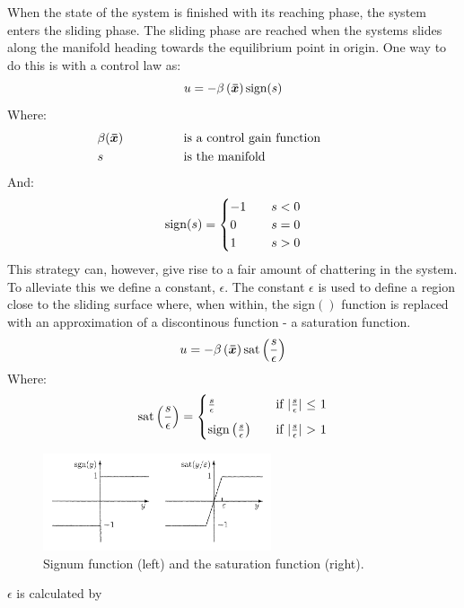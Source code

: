 When the state of the system is finished with its reaching phase, the system enters the sliding phase. The sliding phase
are reached when the systems slides along the manifold heading towards the equilibrium point in origin. One way to do
this is with a control law as:
\begin{equation}
  u = -\beta \left( \bm{\bar{x}} \right)\mathrm{sign}(s)
\end{equation}
Where:
\begin{alignat}{5}
       & \beta (\bm{\bar{x}}) & \hspace{1cm} & \quad\text{is a control gain function} \hspace{1cm} &  & \nonumber \\ 
       & s                & \hspace{1cm} & \quad\text{is the manifold} \hspace{1cm}            &  & \nonumber
\end{alignat}
And:
\begin{equation}
  \mathrm{sign}(s) =
  \begin{cases}
    -1 & \quad s < 0 \\
     0 & \quad s = 0 \\
     1 & \quad s > 0
  \end{cases}
\nonumber
\end{equation}
This strategy can, however, give rise to a fair amount of chattering in the system. To alleviate this we define a
constant, $\epsilon$. The constant $\epsilon$ is used to define a region close to the sliding surface where, when
within, the sign$()$ function is replaced with an approximation of a discontinous function - a saturation function.
\begin{equation}
  u = -\beta\left( \bm{\bar{x}} \right) \mathrm{sat}\left( \frac{s}{\epsilon} \right)
\end{equation}
Where:
\begin{equation}
  \mathrm{sat}\left( \frac{s}{\epsilon} \right) =
  \begin{cases}
    \frac{s}{\epsilon} &\quad \text{if $\vert\frac{s}{\epsilon}\vert$ $\leq$ 1} \\[2mm]
    \mathrm{sign}\left( \frac{s}{\epsilon} \right) &\quad \text{if $\vert \frac{s}{\epsilon}\vert$ $>$ 1}
  \end{cases}
\end{equation}

\begin{figure}[H]
  \centering
  \includegraphics[width=0.6\textwidth]{saturation}
  \caption{Signum function (left) and the saturation function (right).}
  \label{fig:sign_sat}
\end{figure}

$\epsilon$ is calculated by 
